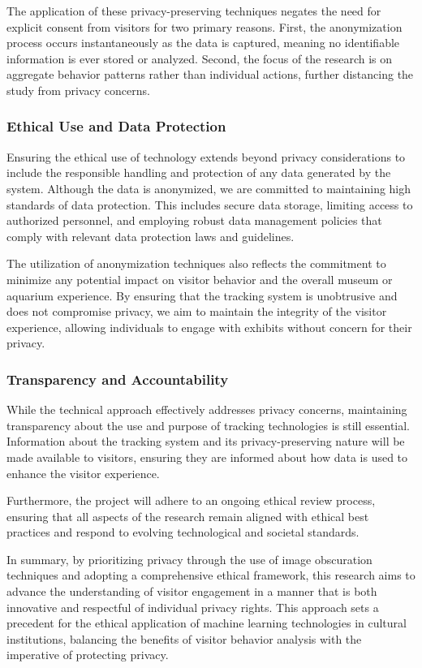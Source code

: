 The application of these privacy-preserving techniques negates the need for explicit consent from visitors for two primary reasons. First, the anonymization process occurs instantaneously as the data is captured, meaning no identifiable information is ever stored or analyzed. Second, the focus of the research is on aggregate behavior patterns rather than individual actions, further distancing the study from privacy concerns.

\subsubsection{Ethical Use and Data Protection}
Ensuring the ethical use of technology extends beyond privacy considerations to include the responsible handling and protection of any data generated by the system. Although the data is anonymized, we are committed to maintaining high standards of data protection. This includes secure data storage, limiting access to authorized personnel, and employing robust data management policies that comply with relevant data protection laws and guidelines.

The utilization of anonymization techniques also reflects the commitment to minimize any potential impact on visitor behavior and the overall museum or aquarium experience. By ensuring that the tracking system is unobtrusive and does not compromise privacy, we aim to maintain the integrity of the visitor experience, allowing individuals to engage with exhibits without concern for their privacy.

\subsubsection{Transparency and Accountability}
While the technical approach effectively addresses privacy concerns, maintaining transparency about the use and purpose of tracking technologies is still essential. Information about the tracking system and its privacy-preserving nature will be made available to visitors, ensuring they are informed about how data is used to enhance the visitor experience.

Furthermore, the project will adhere to an ongoing ethical review process, ensuring that all aspects of the research remain aligned with ethical best practices and respond to evolving technological and societal standards.

In summary, by prioritizing privacy through the use of image obscuration techniques and adopting a comprehensive ethical framework, this research aims to advance the understanding of visitor engagement in a manner that is both innovative and respectful of individual privacy rights. This approach sets a precedent for the ethical application of machine learning technologies in cultural institutions, balancing the benefits of visitor behavior analysis with the imperative of protecting privacy.

